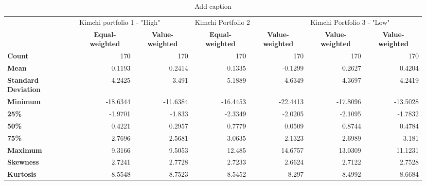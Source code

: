 \documentclass{article}
\begin{document}
\begin{sidewaystable}[htbp]
  \centering
  \caption{Add caption}
    \begin{tabular}{lrrrrrr}
    \toprule
          & \multicolumn{2}{l}{Kimchi portfolio 1 - "High"} & \multicolumn{2}{l}{Kimchi Portfolio 2} & \multicolumn{2}{l}{Kimchi Portfolio 3 - "Low"} \\
\cmidrule{2-7}          & \multicolumn{1}{c}{\textbf{Equal-weighted}} & \multicolumn{1}{c}{\textbf{Value-weighted}} & \multicolumn{1}{c}{\textbf{Equal-weighted}} & \multicolumn{1}{c}{\textbf{Value-weighted}} & \multicolumn{1}{c}{\textbf{Value-weighted}} & \multicolumn{1}{c}{\textbf{Value-weighted}} \\
    \midrule
    \textbf{Count} & 170   & 170   & 170   & 170   & 170   & 170 \\
    \textbf{Mean} & 0.1193 & 0.2414 & 0.1335 & -0.1299 & 0.2627 & 0.4204 \\
    \multicolumn{1}{p{6.22em}}{\textbf{Standard Deviation}} & 4.2425 & 3.491 & 5.1889 & 4.6349 & 4.3697 & 4.2419 \\
    \textbf{Minimum} & -18.6344 & -11.6384 & -16.4453 & -22.4413 & -17.8096 & -13.5028 \\
    \textbf{25\%} & -1.9701 & -1.833 & -2.3349 & -2.0205 & -2.1095 & -1.7832 \\
    \textbf{50\%} & 0.4221 & 0.2957 & 0.7779 & 0.0509 & 0.8744 & 0.4784 \\
    \textbf{75\%} & 2.7696 & 2.5681 & 3.0635 & 2.1323 & 2.6989 & 3.181 \\
    \textbf{Maximum} & 9.3166 & 9.5053 & 12.485 & 14.6757 & 13.0309 & 11.1231 \\
    \textbf{Skewness} & 2.7241 & 2.7728 & 2.7233 & 2.6624 & 2.7122 & 2.7528 \\
    \textbf{Kurtosis} & 8.5548 & 8.7523 & 8.5452 & 8.297 & 8.4992 & 8.6684 \\
    \bottomrule
    \end{tabular}%
  \label{tab:addlabel}%
\end{sidewaystable}%
\end{document}
